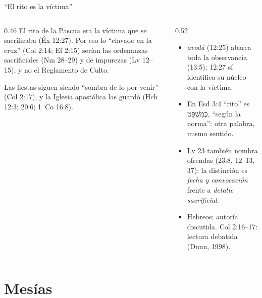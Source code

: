 \documentclass[hyperref={bookmarks=false},aspectratio=169]{beamer}
\newcommand{\heb}[1]{\mbox{\foreignlanguage{hebrew}{#1}}}
\begin{document}
\begin{frame}{``El rito es la víctima''}
\begin{columns}[t,onlytextwidth]
\begin{column}{0.46\textwidth}\small\RaggedRight
El rito de la Pascua era la víctima que se sacrificaba (Éx 12:27). Por eso lo ``clavado en la cruz'' (Col 2:14; Ef 2:15) serían las ordenanzas sacrificiales (Nm 28--29) y de impurezas (Lv 12--15), y no el Reglamento de Culto.\par\smallskip
Las fiestas siguen siendo ``sombra de lo por venir'' (Col 2:17), y la Iglesia apostólica las guardó (Hch 12:3; 20:6; 1~Co 16:8).
\end{column}
\begin{column}{0.52\textwidth}
\begin{tcolorbox}[colback=mostaza!10,colframe=mostaza!85!tierraroja,boxrule=0.6pt,arc=2pt,title={Precisiones},fonttitle=\bfseries\scriptsize,coltitle=caferojizo,colbacktitle=mostaza!30,fontupper=\scriptsize]
\begin{itemize}\scriptsize
\item \emph{avodá} (12:25) abarca toda la observancia (13:5); 12:27 sí identifica su núcleo con la víctima.
\item En Esd 3:4 ``rito'' es \heb{כְּמִשְׁפַּט}, ``según la norma'': otra palabra, mismo sentido.
\item Lv 23 también nombra ofrendas (23:8, 12--13, 37): la distinción es \emph{fecha y convocación} frente a \emph{detalle sacrificial}.
\item Hebreos: autoría discutida. Col 2:16--17: lectura debatida (Dunn, 1998).
\end{itemize}
\end{tcolorbox}
\end{column}
\end{columns}
\end{frame}

\section{Mesías}
\end{document}
